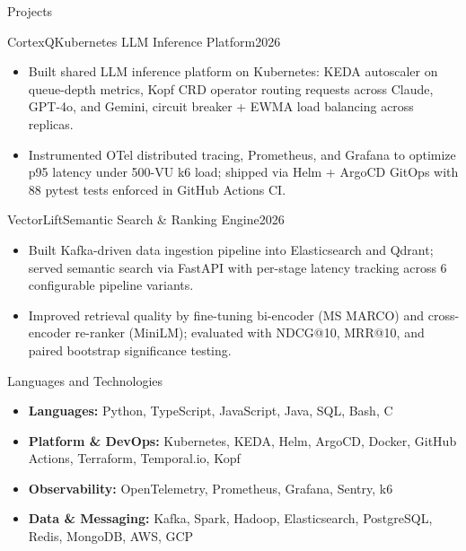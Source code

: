 \documentclass[]{mcdowellcv}
\begin{document}
\begin{cvsection}{Projects}
  \begin{cvsubsection}{CortexQ}{Kubernetes LLM Inference Platform}{2026}
    \begin{itemize}
      \item Built shared LLM inference platform on Kubernetes: KEDA autoscaler on queue-depth metrics, Kopf CRD operator routing requests across Claude, GPT-4o, and Gemini, circuit breaker + EWMA load balancing across replicas.
      \item Instrumented OTel distributed tracing, Prometheus, and Grafana to optimize p95 latency under 500-VU k6 load; shipped via Helm + ArgoCD GitOps with 88 pytest tests enforced in GitHub Actions CI.
    \end{itemize}
    \vspace{-1.5pt}
  \end{cvsubsection}

  \begin{cvsubsection}{VectorLift}{Semantic Search \& Ranking Engine}{2026}
    \begin{itemize}
      \item Built Kafka-driven data ingestion pipeline into Elasticsearch and Qdrant; served semantic search via FastAPI with per-stage latency tracking across 6 configurable pipeline variants.
      \item Improved retrieval quality by fine-tuning bi-encoder (MS MARCO) and cross-encoder re-ranker (MiniLM); evaluated with NDCG@10, MRR@10, and paired bootstrap significance testing.
    \end{itemize}
    \vspace{-1.5pt}
  \end{cvsubsection}

\end{cvsection}

\begin{cvsection}{Languages and Technologies}
  \begin{cvsubsection}{}{}{}
    \begin{itemize}
      \item \textbf{Languages:} Python, TypeScript, JavaScript, Java, SQL, Bash, C
      \item \textbf{Platform \& DevOps:} Kubernetes, KEDA, Helm, ArgoCD, Docker, GitHub Actions, Terraform, Temporal.io, Kopf
      \item \textbf{Observability:} OpenTelemetry, Prometheus, Grafana, Sentry, k6
      \item \textbf{Data \& Messaging:} Kafka, Spark, Hadoop, Elasticsearch, PostgreSQL, Redis, MongoDB, AWS, GCP
    \end{itemize}
  \end{cvsubsection}
\end{cvsection}
\end{document}
